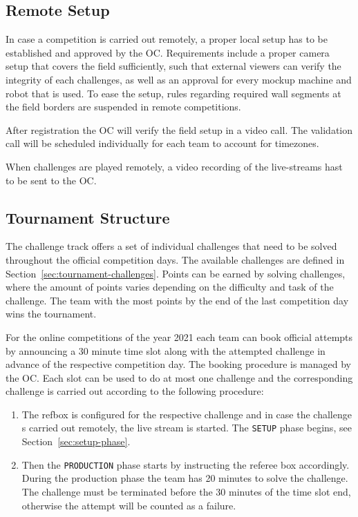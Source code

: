 \documentclass[12pt,twoside]{article}
\newcommand{\refsec}[1]{Section~\ref{#1}}
\begin{document}
\subsection{Remote Setup}
In case a competition is carried out remotely, a proper local setup has to
be established and approved by the \ac{OC}.
Requirements include a proper camera setup that covers the field sufficiently,
such that external viewers can verify the integrity of each challenges,
as well as an approval for every mockup machine and robot that is used.
To ease the setup, rules regarding required wall segments at the field borders
are suspended in remote competitions.

After registration the \ac{OC} will verify the field setup in a video call.
The validation call will be scheduled individually for each team
to account for timezones.

When challenges are played remotely, a video recording of the live-streams
hast to be sent to the \ac{OC}.


\subsection{Tournament Structure}
The challenge track offers a set of individual challenges that need to be solved
throughout the official competition days.
The available challenges are defined in \refsec{sec:tournament-challenges}.
Points can be earned by solving challenges, where the amount of points varies
depending on the difficulty and task of the challenge.
The team with the most points by the end of the last competition day wins
the tournament.

For the online competitions of the year 2021 each team can book official
attempts by announcing a 30 minute time slot along with the attempted challenge
in advance of the respective competition day.
The booking procedure is managed by the \ac{OC}.
Each slot can be used to do at most one challenge and the corresponding
challenge is carried out according to the following procedure:
\begin{enumerate}
  \item The \ac{refbox} is configured for the respective challenge and in case
    the challenge s carried out remotely, the live stream is started.
    The \texttt{SETUP} phase begins, see \refsec{sec:setup-phase}.
	\item Then the \texttt{PRODUCTION} phase starts by instructing the referee
    box accordingly.
    During the production phase the team has 20 minutes to solve the challenge.
    The challenge must be terminated before the 30 minutes of the time slot end,
    otherwise the attempt will be counted as a failure.
\end{enumerate}
\end{document}
